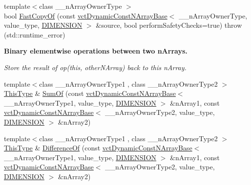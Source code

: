 {\bf }\par
\begin{DoxyCompactItemize}
\item 
{\footnotesize template$<$class \+\_\+\+\_\+n\+Array\+Owner\+Type $>$ }\\bool \hyperlink{classvct_dynamic_n_array_base_a1f4e44b77791a3c1945d4e0f0833e4b0}{Fast\+Copy\+Of} (const \hyperlink{classvct_dynamic_const_n_array_base}{vct\+Dynamic\+Const\+N\+Array\+Base}$<$ \+\_\+\+\_\+n\+Array\+Owner\+Type, value\+\_\+type, \hyperlink{classvct_dynamic_n_array_base_aa66532d28588bdf26d08fb593db815d6abfcde386ec801b212d7c42d63a4f3837}{D\+I\+M\+E\+N\+S\+I\+O\+N} $>$ \&source, bool perform\+Safety\+Checks=true)  throw (std\+::runtime\+\_\+error)
\end{DoxyCompactItemize}

\begin{Indent}{\bf Binary elementwise operations between two n\+Arrays.}\par
{\em Store the result of op(this, other\+N\+Array) back to this n\+Array. }\begin{DoxyCompactItemize}
\item 
{\footnotesize template$<$class \+\_\+\+\_\+n\+Array\+Owner\+Type1 , class \+\_\+\+\_\+n\+Array\+Owner\+Type2 $>$ }\\\hyperlink{classvct_dynamic_const_n_array_base_a5123caffcf1455a1b99003877eade897}{This\+Type} \& \hyperlink{classvct_dynamic_n_array_base_a400251dd48d2a5b85f6fc290d78a18d4}{Sum\+Of} (const \hyperlink{classvct_dynamic_const_n_array_base}{vct\+Dynamic\+Const\+N\+Array\+Base}$<$ \+\_\+\+\_\+n\+Array\+Owner\+Type1, value\+\_\+type, \hyperlink{classvct_dynamic_n_array_base_aa66532d28588bdf26d08fb593db815d6abfcde386ec801b212d7c42d63a4f3837}{D\+I\+M\+E\+N\+S\+I\+O\+N} $>$ \&n\+Array1, const \hyperlink{classvct_dynamic_const_n_array_base}{vct\+Dynamic\+Const\+N\+Array\+Base}$<$ \+\_\+\+\_\+n\+Array\+Owner\+Type2, value\+\_\+type, \hyperlink{classvct_dynamic_n_array_base_aa66532d28588bdf26d08fb593db815d6abfcde386ec801b212d7c42d63a4f3837}{D\+I\+M\+E\+N\+S\+I\+O\+N} $>$ \&n\+Array2)
\item 
{\footnotesize template$<$class \+\_\+\+\_\+n\+Array\+Owner\+Type1 , class \+\_\+\+\_\+n\+Array\+Owner\+Type2 $>$ }\\\hyperlink{classvct_dynamic_const_n_array_base_a5123caffcf1455a1b99003877eade897}{This\+Type} \& \hyperlink{classvct_dynamic_n_array_base_a5eab5f37af9612a9c4aafa4092247291}{Difference\+Of} (const \hyperlink{classvct_dynamic_const_n_array_base}{vct\+Dynamic\+Const\+N\+Array\+Base}$<$ \+\_\+\+\_\+n\+Array\+Owner\+Type1, value\+\_\+type, \hyperlink{classvct_dynamic_n_array_base_aa66532d28588bdf26d08fb593db815d6abfcde386ec801b212d7c42d63a4f3837}{D\+I\+M\+E\+N\+S\+I\+O\+N} $>$ \&n\+Array1, const \hyperlink{classvct_dynamic_const_n_array_base}{vct\+Dynamic\+Const\+N\+Array\+Base}$<$ \+\_\+\+\_\+n\+Array\+Owner\+Type2, value\+\_\+type, \hyperlink{classvct_dynamic_n_array_base_aa66532d28588bdf26d08fb593db815d6abfcde386ec801b212d7c42d63a4f3837}{D\+I\+M\+E\+N\+S\+I\+O\+N} $>$ \&n\+Array2)

\end{DoxyCompactItemize}
\end{Indent}
